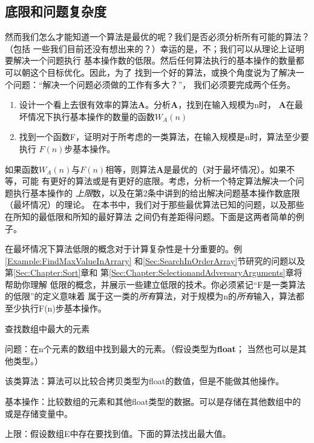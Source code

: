 \subsection{底限和问题复杂度}
然而我们怎么才能知道一个算法是最优的呢？我们是否必须分析所有可能的算法？（包括
一些我们目前还没有想出来的？）幸运的是，不；我们可以从理论上证明要解决一个问题执行
基本操作数的低限。然后任何算法执行的基本操作的数量都可以朝这个目标优化。因此，为了
找到一个好的算法，或换个角度说为了解决一个问题：“解决一个问题必须做的工作有多大？”，
我们必须要完成两个任务。
\begin{enumerate}
\item 设计一个看上去很有效率的算法\textbf{A}。分析\textbf{A}，找到在输入规模为n时，
    \textbf{A}在最坏情况下执行基本操作的数量的函数$W_A(n)$
\item 找到一个函数F，证明对于所考虑的一类算法，在输入规模是n时，算法至少要执行
    $F(n)$步基本操作。
\end{enumerate}
如果函数$W_A(n)$与$F(n)$相等，则算法\textbf{A}是最优的（对于最坏情况）。如果不等，可能
有更好的算法或是有更好的底限。考虑，分析一个特定算法解决一个问题执行基本操作的
\emph{上限}数，以及在第2条中讲到的给出解决问题基本操作数底限（最坏情况）的理论。
在本书中，我们对于那些最优算法已知的问题，以及那些在所知的最低限和所知的最好算法
之间仍有差距得问题。下面是这两者简单的例子。

在最坏情况下算法低限的概念对于计算复杂性是十分重要的。例\ref{Example:FindMaxValueInArrary}
和\ref{Sec:SearchInOrderArray}节研究的问题以及第\ref{Sec:Chapter:Sort}章和
第\ref{Sec:Chapter:SelectionandAdversaryArguments}章将帮助你理解
低限的概念，并展示一些建立低限的技术。你必须紧记“F是一类算法的低限”的定义意味着
属于这一类的\emph{所有}算法，对于规模为n的\emph{所有}输入，算法都至少执行F(n)步基本操作。

\begin{example}\label{Example:FindMaxValueInArrary}
查找数组中最大的元素

问题：在n个元素的数组中找到最大的元素。（假设类型为\textbf{float}；
当然也可以是其他类型。）

该类算法：算法可以比较合拷贝类型为float的数值，但是不能做其他操作。

基本操作：比较数组的元素和其他float类型的数据。可以是存储在其他数组中的
或是存储变量中。

上限：假设数组E中存在要找到值。下面的算法找出最大值。
\end{example}

